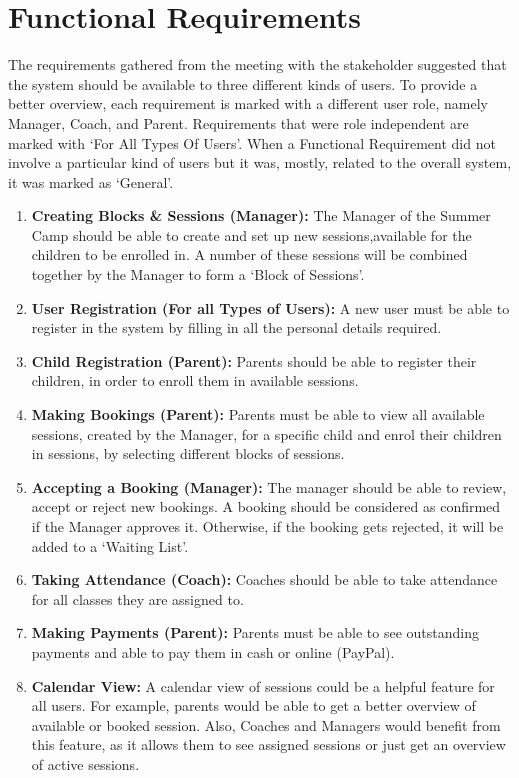 \documentclass{l3proj}
\begin{document}
\section{Functional Requirements}
The requirements gathered from the meeting with the stakeholder suggested that the system should be available to three different kinds of users. To provide a better overview, each requirement is marked with a different user role, namely Manager, Coach, and Parent. Requirements that were role independent are marked with `For All Types Of Users'. When a Functional Requirement did not involve a particular kind of users but it was, mostly, related to the overall system, it was marked as `General'.
\begin{enumerate}
	\item \textbf{Creating Blocks \& Sessions (Manager):} The Manager of the Summer Camp should be able to create and set up new sessions,available for the children to be enrolled in. A number of these sessions will be combined together by the Manager to form a `Block of Sessions'.
	\item \textbf{User Registration (For all Types of Users):} A new user must be able to register in the system by filling in all the personal details required.
	\item \textbf{Child Registration (Parent):} Parents should be able to register their children, in order to enroll them in available sessions.
	\item \textbf{Making Bookings (Parent):} Parents must be able to view all available sessions, created by the Manager, for a specific child and enrol their children in sessions, by selecting different blocks of sessions.
	\item \textbf{Accepting a Booking (Manager):} The manager should be able to review, accept or reject new bookings. A booking should be considered as confirmed if the Manager approves it. Otherwise, if the booking gets rejected, it will be added to a `Waiting List'.
	\item \textbf{Taking Attendance (Coach):} Coaches should be able to take attendance for all classes they are assigned to.
	\item \textbf{Making Payments (Parent):} Parents must be able to see outstanding payments and able to pay them in cash or online (PayPal).
	\item \textbf{Calendar View:} A calendar view of sessions could be a helpful feature for all users. For example, parents would be able to get a better overview of available or booked session. Also, Coaches and Managers would benefit from this feature, as it allows them to see assigned sessions or just get an overview of active sessions.

\end{enumerate}
\end{document}
